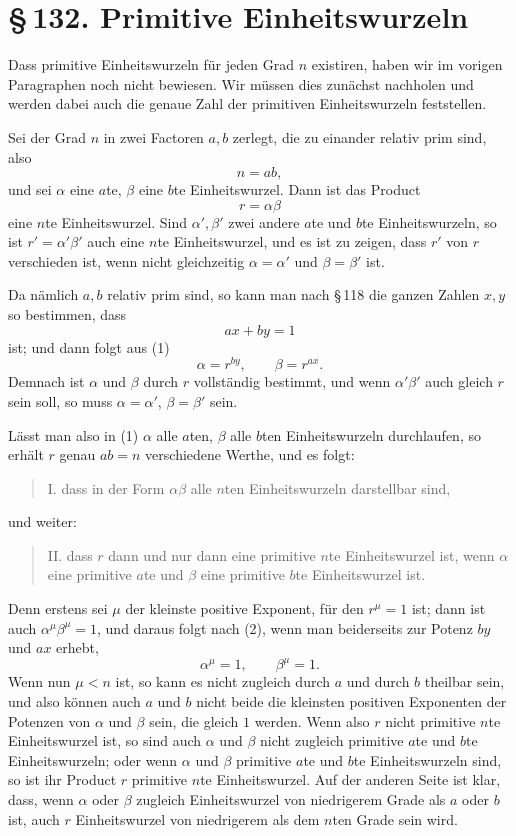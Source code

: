 \documentclass[11pt]{article}
\providecommand{\sect}[2]{\section*{\S\,#1. #2}}
\begin{document}
\sect{132}{Primitive Einheitswurzeln}

Dass primitive Einheitswurzeln für jeden Grad $n$ existiren, haben wir im vorigen Paragraphen noch nicht bewiesen. Wir müssen dies zunächst nachholen und werden dabei auch die genaue Zahl der primitiven Einheitswurzeln feststellen.

Sei der Grad $n$ in zwei Factoren $a,b$ zerlegt, die zu einander relativ prim sind, also
\[
        n=ab,
\]
und sei $\alpha$ eine $a$te, $\beta$ eine $b$te Einheitswurzel. Dann ist das Product
\[
\tag{1}        r=\alpha\beta
\]
eine $n$te Einheitswurzel. Sind $\alpha',\beta'$ zwei andere $a$te und $b$te Einheitswurzeln, so ist $r'=\alpha'\beta'$ auch eine $n$te Einheitswurzel, und es ist zu zeigen, dass $r'$ von $r$ verschieden ist, wenn nicht gleichzeitig $\alpha=\alpha'$ und $\beta=\beta'$ ist.

Da nämlich $a,b$ relativ prim sind, so kann man nach \S\,118 die ganzen Zahlen $x,y$ so bestimmen, dass
\[
\tag{2}        ax+by=1
\]
ist; und dann folgt aus (1)
\[
        \alpha=r^{by},\qquad \beta=r^{ax}.
\]
Demnach ist $\alpha$ und $\beta$ durch $r$ vollständig bestimmt, und wenn $\alpha'\beta'$ auch gleich $r$ sein soll, so muss $\alpha=\alpha'$, $\beta=\beta'$ sein.

Lässt man also in (1) $\alpha$ alle $a$ten, $\beta$ alle $b$ten Einheitswurzeln durchlaufen, so erhält $r$ genau $ab=n$ verschiedene Werthe, und es folgt:
\begin{quote}
I. dass in der Form $\alpha\beta$ alle $n$ten Einheitswurzeln darstellbar sind,
\end{quote}
und weiter:
\begin{quote}
II. dass $r$ dann und nur dann eine primitive $n$te Einheitswurzel ist, wenn $\alpha$ eine primitive $a$te und $\beta$ eine primitive $b$te Einheitswurzel ist.
\end{quote}
Denn erstens sei $\mu$ der kleinste positive Exponent, für den $r^\mu=1$ ist; dann ist auch $\alpha^\mu\beta^\mu=1$, und daraus folgt nach (2), wenn man beiderseits zur Potenz $by$ und $ax$ erhebt,
\[
        \alpha^\mu=1,\qquad \beta^\mu=1.
\]
Wenn nun $\mu<n$ ist, so kann es nicht zugleich durch $a$ und durch $b$ theilbar sein, und also können auch $a$ und $b$ nicht beide die kleinsten positiven Exponenten der Potenzen von $\alpha$ und $\beta$ sein, die gleich $1$ werden. Wenn also $r$ nicht primitive $n$te Einheitswurzel ist, so sind auch $\alpha$ und $\beta$ nicht zugleich primitive $a$te und $b$te Einheitswurzeln; oder wenn $\alpha$ und $\beta$ primitive $a$te und $b$te Einheitswurzeln sind, so ist ihr Product $r$ primitive $n$te Einheitswurzel. Auf der anderen Seite ist klar, dass, wenn $\alpha$ oder $\beta$ zugleich Einheitswurzel von niedrigerem Grade als $a$ oder $b$ ist, auch $r$ Einheitswurzel von niedrigerem als dem $n$ten Grade sein wird.
\end{document}
